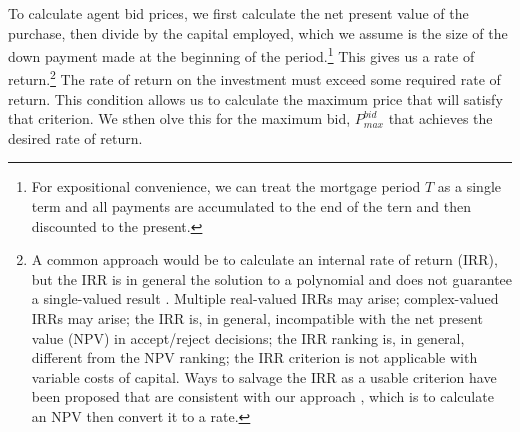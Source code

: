 

To calculate agent bid prices, we first calculate the net present value of the purchase, then divide by the capital employed, which we assume is the size of the down payment made at the beginning of the period.\footnote{For expositional convenience, we can treat the mortgage period $T$ as a single term and all payments are accumulated to the end of the tern and then discounted to the present.} 
 This gives us a rate of return.\footnote{A common approach would be to calculate an internal rate of return (IRR), but  the IRR is in general the solution to a polynomial and does not guarantee a single-valued result \cite{robinsonOptimalTerminationIRR1996}. Multiple real-valued  IRRs may arise;  complex-valued IRRs may arise;  the IRR is, in general, incompatible with the net present value (NPV) in accept/reject decisions; the IRR ranking is, in general, different from the NPV ranking; the IRR criterion is not applicable with variable costs of capital. Ways to salvage the IRR as a usable criterion have been proposed that are consistent with our approach \cite{magniAverageInternalRate2010}, which is to calculate an NPV then convert it to a rate.} 
The rate of return on the investment must exceed some required rate of return. This condition allows us to calculate the maximum price that will satisfy that criterion.
We sthen olve this for  the maximum bid, $P_{max}^{bid}$ that achieves the desired rate of return. 

